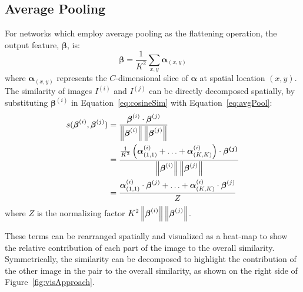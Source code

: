 \subsection{Average Pooling}
For networks which employ average pooling as the flattening operation, the output feature, $\boldsymbol{\beta}$, is:
\begin{equation} 
\boldsymbol{\beta} = \frac{1}{K^2}\sum_{x,y} \boldsymbol{\alpha}_{(x,y)}
\label{eq:avgPool}
\end{equation}
\noindent where $\boldsymbol{\alpha}_{(x,y)}$ represents the $C$-dimensional slice of $\boldsymbol{\alpha}$  at spatial location $(x,y)$. The similarity of images $I^{(i)}$ and $I^{(j)}$ can be directly decomposed spatially, by substituting $\boldsymbol{\beta}^{(i)}$ in Equation~\ref{eq:cosineSim} with Equation~\ref{eq:avgPool}:
\begin{align}
    s(\boldsymbol{\beta}^{(i)},\boldsymbol{\beta}^{(j)}) &= \frac{\boldsymbol{\beta}^{(i)}\cdot\boldsymbol{\beta}^{(j)}}{\left\lVert\boldsymbol{\beta}^{(i)}\right\rVert \left\lVert\boldsymbol{\beta}^{(j)}\right\rVert}\nonumber\\
    &=
    \frac{\frac{1}{K^2}\left(\boldsymbol{\alpha}^{(i)}_{(1,1)} + \ldots + \boldsymbol{\alpha}^{(i)}_{(K,K)}\right)  \cdot \boldsymbol{\beta^{(j)}}}{\left\lVert\boldsymbol{\beta}^{(i)}\right\rVert \left\lVert\boldsymbol{\beta}^{(j)}\right\rVert}\nonumber\\
    &= \frac{\boldsymbol{\alpha}^{(i)}_{(1,1)} \cdot \boldsymbol{\beta}^{(j)} + \ldots + \boldsymbol{\alpha}^{(i)}_{(K,K)} \cdot \boldsymbol{\beta}^{(j)}
    }{Z}
\end{align}
\noindent where $Z$ is the normalizing factor $K^2 \left\lVert\boldsymbol{\beta}^{(i)}\right\rVert \left\lVert\boldsymbol{\beta}^{(j)}\right\rVert$.

These terms can be rearranged spatially and visualized as a heat-map to show the relative contribution of each part of the image to the overall similarity. Symmetrically, the similarity can be decomposed to highlight the contribution of the other image in the pair to the overall similarity, as shown on the right side of Figure~\ref{fig:visApproach}.

